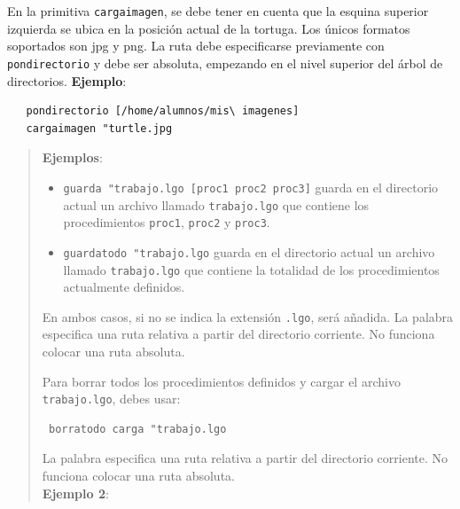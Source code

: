En la primitiva \texttt{cargaimagen}, se debe tener en cuenta que
la esquina superior izquierda se ubica en la posici\'on actual de la
tortuga. Los \'unicos formatos soportados son jpg 
y png.  La ruta debe especificarse previamente 
con \texttt{pondirectorio} y debe ser absoluta, empezando en el nivel superior
del \'arbol de directorios. \textbf{Ejemplo}:
\begin{verbatim}
   pondirectorio [/home/alumnos/mis\ imagenes]
   cargaimagen "turtle.jpg
\end{verbatim}

\begin{quote}
  \noindent \textbf{Ejemplos}:
  \begin{itemize}
     \item \verb+guarda "trabajo.lgo [proc1 proc2 proc3]+
        guarda en el directorio actual un archivo llamado \texttt{trabajo.lgo}
        que contiene los procedimientos \texttt{proc1}, \texttt{proc2} y
        \texttt{proc3}. 
     \item \verb+guardatodo "trabajo.lgo+ guarda en el directorio actual
        un archivo llamado \texttt{trabajo.lgo} que contiene la totalidad
        de los procedimientos actualmente definidos. 
   \end{itemize}
   \noindent En ambos casos, si no se indica la extensi\'on \texttt{.lgo},
   ser\'a a\~nadida. La palabra especifica una ruta relativa a partir del
   directorio corriente. No funciona colocar una ruta absoluta.

   Para borrar todos los procedimientos definidos y cargar el archivo
   \texttt{trabajo.lgo}, debes usar: 
   \begin{verbatim}
 borratodo carga "trabajo.lgo \end{verbatim}
   La palabra especifica una ruta relativa a partir del directorio corriente.
   No funciona colocar una ruta absoluta. \\

   \noindent \textbf{Ejemplo 2}:


\end{quote}
